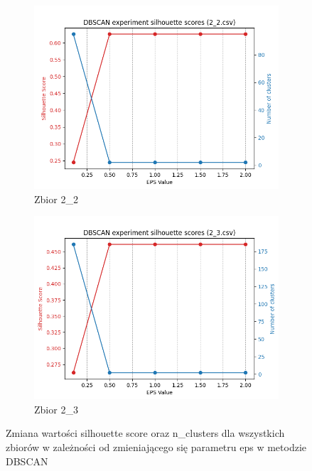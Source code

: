 \documentclass[12pt]{article}
\begin{document}
\begin{figure}[H]
\begin{subfigure}[b]{0.3\textwidth}
        \includegraphics[width=\linewidth]{img/exp_1/dbscan/2_2_scores.png}
        \caption{Zbior 2\_2}
    \end{subfigure}
    \hfill
    \begin{subfigure}[b]{0.3\textwidth}
        \includegraphics[width=\linewidth]{img/exp_1/dbscan/2_3_scores.png}
        \caption{Zbior 2\_3}
    \end{subfigure}
    \caption{\centering Zmiana wartości silhouette score oraz n\_clusters dla wszystkich zbiorów w zależności od zmieniającego się parametru eps w metodzie DBSCAN}
\end{figure}
\end{document}
